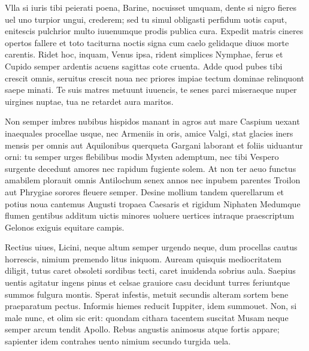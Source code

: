 \documentclass{book}
\newenvironment {carmen} [1] [\relax] 
  {\Titulus \Versus \incipit*\numerus{1}#1}
  {\endVersus}
\newcommand {\Sapphic}   {\Forma \strophae {0 \poena 00 \poena 1}}
\newcommand {\Alcaic}    {\Forma \strophae {0 \poena 01 \poena 2}}
\begin{document}
\begin{carmen}[\Sapphic]


Vlla si iuris tibi peierati
 poena, Barine, nocuisset umquam,
 dente si nigro fieres uel uno
      turpior ungui, 
crederem; sed tu simul obligasti               
 perfidum uotis caput, enitescis
 pulchrior multo iuuenumque prodis
      publica cura. 
Expedit matris cineres opertos
 fallere et toto taciturna noctis               
 signa cum caelo gelidaque diuos
      morte carentis. 
Ridet hoc, inquam, Venus ipsa, rident
 simplices Nymphae, ferus et Cupido
 semper ardentis acuens sagittas               
      cote cruenta. 
Adde quod pubes tibi crescit omnis,
 seruitus crescit noua nec priores
 impiae tectum dominae relinquont
      saepe minati.                
Te suis matres metuunt iuuencis,
 te senes parci miseraeque nuper
 uirgines nuptae, tua ne retardet
      aura maritos. 

\end{carmen}

\begin{carmen}[\Alcaic]


Non semper imbres nubibus hispidos
 manant in agros aut mare Caspium
      uexant inaequales procellae
      usque, nec Armeniis in oris, 
amice Valgi, stat glacies iners                 
mensis per omnis aut Aquilonibus
      querqueta Gargani laborant
      et foliis uiduantur orni: 
tu semper urges flebilibus modis
 Mysten ademptum, nec tibi Vespero               
      surgente decedunt amores
      nec rapidum fugiente solem. 
At non ter aeuo functus amabilem
 plorauit omnis Antilochum senex
      annos nec inpubem parentes               
      Troilon aut Phrygiae sorores 
fleuere semper. Desine mollium
 tandem querellarum et potius noua
      cantemus Augusti tropaea
      Caesaris et rigidum Niphaten                
Medumque flumen gentibus additum
 uictis minores uoluere uertices
      intraque praescriptum Gelonos
      exiguis equitare campis. 

\end{carmen}

\begin{carmen}[\Sapphic]


Rectius uiues, Licini, neque altum
 semper urgendo neque, dum procellas
 cautus horrescis, nimium premendo
      litus iniquom. 
Auream quisquis mediocritatem               
 diligit, tutus caret obsoleti
 sordibus tecti, caret inuidenda
      sobrius aula. 
Saepius uentis agitatur ingens
 pinus et celsae grauiore casu               
 decidunt turres feriuntque summos
      fulgura montis. 
Sperat infestis, metuit secundis
 alteram sortem bene praeparatum
 pectus. Informis hiemes reducit               
      Iuppiter, idem 
summouet. Non, si male nunc, et olim
 sic erit: quondam cithara tacentem
 suscitat Musam neque semper arcum
      tendit Apollo.                
Rebus angustis animosus atque
 fortis appare; sapienter idem
 contrahes uento nimium secundo
      turgida uela. 

\end{carmen}
\end{document}
